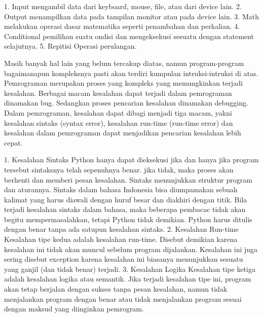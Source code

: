 	\begin {enumerate}
	
	1. Input
	mengambil data dari keyboard, mouse, file, atau dari device lain.
	2. Output
	menampilkan data pada tampilan monitor atau pada device lain.
	3. Math
	melakukan operasi dasar matematika seperti penambahan dan perkalian.
	4. Conditional
	pemilihan suatu ondisi dan mengeksekusi sesuatu dengan statement selajutnya.
	5. Repitisi
	Operasi perulangan.
	
	\end {enumerate}
      	Masih banyak hal lain yang belum tercakup diatas, namun program-program bagaimanapun kompleksnya pasti akan terdiri
      	kumpulan intruksi-intruksi di atas.
	Pemrograman merupakan proses yang kompleks yang memungkinkan terjadi kesalahan.
	Berbagai macam kesalahan dapat terjadi dalam pemrograman dinamakan bug. Sedangkan proses pencarian kesalahan dinamakan
	debugging. Dalam pemrograman, kesalahan dapat dibagi menjadi tiga macam, yakni kesalahan sintaks (syntax error), kesalahan run-time (run-time error)
	dan kesalahan dalam pemrograman dapat menjadikan pencarian kesalahan lebih cepat.
	
	\begin {enumerate}
	
	1. Kesalahan Sintaks
	   Python hanya dapat dieksekusi jika dan hanya jika program tersebut sintaksnya telah sepenuhnya benar.
	   jika tidak, maka proses akan berhenti dan memberi pesan kesalahan. Sintaks menunjukkan struktur program dan aturannya.
	   Sintaks dalam bahasa Indonesia bisa diumpamakan sebuah kalimat yang harus diawali dengan huruf besar dan 
	   diakhiri dengan titik. Bila terjadi kesalahan sintaks dalam bahasa, maka beberapa pembacac tidak akan begitu mempermasalahkan, tetapi Python
	   tidak demikian. Python harus ditulis dengan benar tanpa ada satupun kesalahan sintaks.
	2. Kesalahan Run-time
	   Kesalahan tipe kedua adalah kesalahan run-time. Disebut demikian karena kesalahan ini tidak akan muncul sebelum program dijalankan.
	   Kesalahan ini juga sering disebut exception karena kesalahan ini biasanya menunjukkan sesuatu yang ganjil (dan tidak benar) terjadi.
	3. Kesalahan Logika 
	   Kesalahan tipe ketiga adalah kesalahan logika atau semantik. Jika terjadi kesalahan tipe ini, program akan tetap berjalan dengan sukses tanpa 
	   pesan kesalahan, namun tidak menjalankan program dengan benar atau tidak menjalankan program sesuai dengan
	   maksud yang diinginkan pemrogram.
	\end {enumerate}
	
